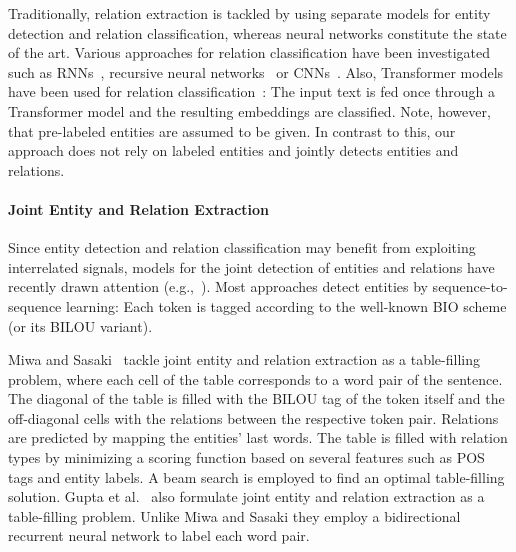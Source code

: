 \documentclass{ecai}
\begin{document}
Traditionally, relation extraction is tackled by using separate models for entity detection and relation classification, whereas neural networks constitute the state of the art. Various approaches for relation classification have been investigated such as RNNs~\cite{zhang:2015:rel_pos}, recursive neural networks~\cite{socher:2012:mv_rnn} or CNNs~\cite{zeng:2014:rel_cnn}. Also, Transformer models have been used for relation classification~\cite{verga:2018:transformer_encoder_bio_rc,wang:2019:bert_one_pass_rc}: The input text is fed once through a Transformer model and the resulting embeddings are classified. Note, however, that pre-labeled entities are assumed to be given. In contrast to this, our approach does not rely on labeled entities and jointly detects entities and relations.

\paragraph{Joint Entity and Relation Extraction} Since 
entity detection and relation classification may benefit from exploiting interrelated signals, models for the joint detection of entities and relations have recently drawn attention (e.g.,~\cite{bekoulis:2018:multi_head,bekoulis:2018:adversarial, luan:2019:span_graphs, tran:2019:metric_learning, zhang:2017:rel_glob, li:2017:joint_bio}). Most approaches detect entities by sequence-to-sequence learning: Each token is tagged according to the well-known BIO scheme (or its BILOU variant). 


Miwa and Sasaki~\cite{miwa:2014:table} tackle joint entity and relation extraction as a table-filling problem, where each cell of the table corresponds to a word pair of the sentence. The diagonal of the table is filled with the BILOU tag of the token itself and the off-diagonal cells with the relations between the respective token pair. Relations are predicted by mapping the entities' last words. The table is filled with relation types by minimizing a scoring function based on several features such as POS tags and entity labels. A beam search is employed to find an optimal table-filling solution.
Gupta et al.~\cite{gupta:2016:table_filling} also formulate joint entity and relation extraction as a table-filling problem. Unlike Miwa and Sasaki they employ a bidirectional recurrent neural network to label each word pair.
\end{document}
